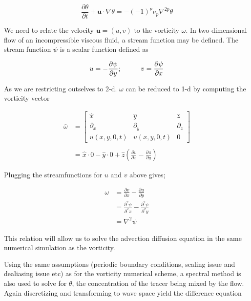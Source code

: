 \begin{equation}
\frac{\partial \theta}{\partial t} + \mathbf{u} \cdot \nabla \theta = - (-1)^p \nu_p \nabla^{2p} \theta 
\end{equation}

We need to relate the velocity $\mathbf{u} = (u,v)$ to the vorticity $\omega$. In two-dimensional flow of an incompressible viscous fluid, a stream function may be defined. The stream function $\psi$ is a scalar function defined as

\begin{equation*}
  u = -\frac{\partial \psi}{\partial y}; \hspace*{1cm} v = \frac{\partial \psi}{\partial x}
\end{equation*}

As we are restricting outselves to 2-d. $\omega$ can be reduced to 1-d by computing the vorticity vector

\begin{align*}
  \bar{\omega} &= 
      \begin{bmatrix}
	\hat{x} & \hat{y} & \hat{z} \\
	\partial_{x} & \partial_{y} & \partial_{z} \\
	u(x,y,0,t) & u(x,y,0,t) & 0 
      \end{bmatrix} \\ \\
      &= \hat{x} \cdot 0 - \hat{y} \cdot 0 + \hat{z} \left( \frac{\partial v}{\partial x} - \frac{\partial u}{\partial y} \right)
\end{align*}

Plugging the streamfunctions for $u$ and $v$ above gives;

\begin{align*}
  \omega &= \frac{\partial v}{\partial x} - \frac{\partial u}{\partial y} \\
	 &= \frac{\partial^{2} \psi}{\partial^{2} x} - \frac{\partial^{2} \psi}{\partial^{2} y} \\
	 &= \nabla^{2} \psi
\end{align*}

This relation will allow us to solve the advection diffusion equation in the same numerical simulation as the vorticity.

Using the same assumptions (periodic boundary conditions, scaling issue and dealiasing issue etc) as for the vorticity numerical scheme, a spectral method is also used to solve for $\theta$, the concentration of
the tracer being mixed by the flow.
Again discretizing and transforming to wave space yield the difference equation

